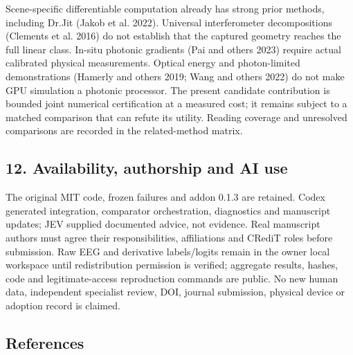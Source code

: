 \documentclass[
  10pt,
]{article}
\begin{document}
Scene-specific differentiable computation already has strong prior
methods, including Dr.Jit (Jakob et al. 2022). Universal interferometer
decompositions (Clements et al. 2016) do not establish that the captured
geometry reaches the full linear class. In-situ photonic gradients (Pai
and others 2023) require actual calibrated physical measurements.
Optical energy and photon-limited demonstrations (Hamerly and others
2019; Wang and others 2022) do not make GPU simulation a photonic
processor. The present candidate contribution is bounded joint numerical
certification at a measured cost; it remains subject to a matched
comparison that can refute its utility. Reading coverage and unresolved
comparisons are recorded in the related-method matrix.

\hypertarget{availability-authorship-and-ai-use}{%
\subsection{12. Availability, authorship and AI
use}\label{availability-authorship-and-ai-use}}

The original MIT code, frozen failures and addon 0.1.3 are retained.
Codex generated integration, comparator orchestration, diagnostics and
manuscript updates; JEV supplied documented advice, not evidence. Real
manuscript authors must agree their responsibilities, affiliations and
CRediT roles before submission. Raw EEG and derivative labels/logits
remain in the owner local workspace until redistribution permission is
verified; aggregate results, hashes, code and legitimate-access
reproduction commands are public. No new human data, independent
specialist review, DOI, journal submission, physical device or adoption
record is claimed.

\hypertarget{references}{%
\subsection*{References}\label{references}}
\end{document}
